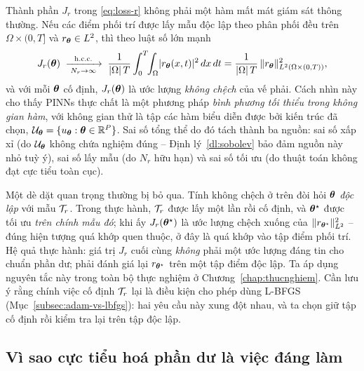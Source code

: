 \begin{nhanxet}
\label{rem:monte-carlo}
Thành phần $J_{r}$ trong \eqref{eq:loss-r} không phải một hàm mất mát giám sát
thông thường. Nếu các điểm phối trí được lấy mẫu độc lập theo phân phối đều trên
$\Omega \times (0,T]$ và $r_{\bm{\theta}} \in L^2$, thì theo luật số lớn mạnh
\begin{equation}
J_{r}(\bm{\theta})
\;\xrightarrow[\;N_{r} \to \infty\;]{\text{h.c.c.}}\;
\frac{1}{\lvert\Omega\rvert\,T}
\int_{0}^{T}\!\!\int_{\Omega}
\lvert r_{\bm{\theta}}(x,t)\rvert^{2}\, dx\, dt
= \frac{1}{\lvert\Omega\rvert\,T}\,
\lVert r_{\bm{\theta}}\rVert_{L^{2}(\Omega \times (0,T))}^{2},
\label{eq:mc-estimate}
\end{equation}
và với mỗi $\bm{\theta}$ cố định, $J_r(\bm{\theta})$ là ước lượng \emph{không chệch} của
vế phải. Cách nhìn này cho thấy PINNs thực chất là một phương pháp \emph{bình
phương tối thiểu trong không gian hàm}, với không gian thử là tập các hàm biểu
diễn được bởi kiến trúc đã chọn,
$\mathcal{U}_{\bm{\theta}} = \{u_{\bm{\theta}} : \bm{\theta} \in \mathbb{R}^{P}\}$. Sai số tổng thể
do đó tách thành ba nguồn: sai số xấp xỉ (do $\mathcal{U}_{\bm{\theta}}$ không chứa
nghiệm đúng -- Định lý~\ref{dl:sobolev} bảo đảm nguồn này nhỏ tuỳ ý), sai số lấy
mẫu (do $N_{r}$ hữu hạn) và sai số tối ưu (do thuật toán không đạt cực tiểu toàn
cục).
 
Một dè dặt quan trọng thường bị bỏ qua. Tính không chệch ở trên đòi hỏi $\bm{\theta}$
\emph{độc lập} với mẫu $\mathcal{T}_r$. Trong thực hành, $\mathcal{T}_r$ được lấy một lần rồi
cố định, và $\bm{\theta}^{\star}$ được tối ưu \emph{trên chính mẫu đó}; khi ấy
$J_r(\bm{\theta}^{\star})$ là ước lượng chệch xuống của
$\lVert r_{\bm{\theta}^\star}\rVert^2_{L^2}$ -- đúng hiện tượng quá khớp quen thuộc, ở đây
là quá khớp vào tập điểm phối trí. Hệ quả thực hành: giá trị $J_r$ cuối cùng
\emph{không} phải một ước lượng đáng tin cho chuẩn phần dư; phải đánh giá lại
$r_{\bm{\theta}^\star}$ trên một tập điểm độc lập. Ta áp dụng nguyên tắc này trong
toàn bộ thực nghiệm ở Chương~\ref{chap:thucnghiem}. Cần lưu ý rằng chính việc cố
định $\mathcal{T}_r$ lại là điều kiện cho phép dùng L-BFGS
(Mục~\ref{subsec:adam-vs-lbfgs}): hai yêu cầu này xung đột nhau, và ta chọn giữ
tập cố định rồi kiểm tra lại trên tập độc lập.
\end{nhanxet}
 
\subsection{Vì sao cực tiểu hoá phần dư là việc đáng làm}
\label{subsec:chan-on-dinh}
 
